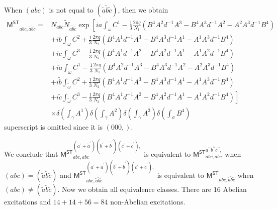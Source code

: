 \documentclass[11pt,nofootinbib,preprint]{revtex4-1}
\begin{document}
When $\left(abc\right)$ is not equal to $\left(\tilde{a}\tilde{b}\tilde{c}\right)$, then we obtain
\begin{align}
	\mathsf{M^{ST}}_{abc,\tilde{a}\tilde{b}\tilde{c}}=&N_{abc}\tilde{N}_{\tilde{a}\tilde{b}\tilde{c}}\exp \left[ ia\int_{\omega}{C^1-\frac{1}{3}\frac{2\pi q}{N_1}\left( B^4A^2d^{-1}A^3-B^4A^3d^{-1}A^2-A^2A^3d^{-1}B^4 \right)} \right. \nonumber
	\\
	&+ib\int_{\omega}{C^2+\frac{1}{3}\frac{2\pi q}{N_2}\left( B^4A^1d^{-1}A^3-B^4A^3d^{-1}A^1-A^1A^3d^{-1}B^4 \right)} \nonumber
	\\
	&+ic\int_{\omega}{C^3-\frac{1}{3}\frac{2\pi q}{N_3}\left( B^4A^1d^{-1}A^2-B^4A^2d^{-1}A^1-A^1A^2d^{-1}B^4 \right)} \nonumber
	\\
	&+i\tilde{a}\int_{\tilde{\omega}}{C^1-\frac{1}{3}\frac{2\pi q}{N_1}\left( B^4A^2d^{-1}A^3-B^4A^3d^{-1}A^2-A^2A^3d^{-1}B^4 \right)} \nonumber
	\\
	&+i\tilde{b}\int_{\tilde{\omega}}{C^2+\frac{1}{3}\frac{2\pi q}{N_2}\left( B^4A^1d^{-1}A^3-B^4A^3d^{-1}A^1-A^1A^3d^{-1}B^4 \right)} \nonumber
	\\
	&+\left. i\tilde{c}\int_{\tilde{\omega}}{C^3-\frac{1}{3}\frac{2\pi q}{N_3}\left( B^4A^1d^{-1}A^2-B^4A^2d^{-1}A^1-A^1A^2d^{-1}B^4 \right)} \right] \nonumber
	\\
	&\times \delta \left( \int_{\gamma}{A^1} \right) \delta \left( \int_{\gamma}{A^2} \right) \delta \left( \int_{\gamma}{A^3} \right) \delta \left( \int_{\sigma}{B^4} \right) 
\end{align}
superscript is omitted since it is $\left(000,\right)$. 

We conclude that $\mathsf{M^{ST}}_{abc,abc}^{\left( a^{\prime}+\tilde{a}^{\prime} \right) \left( b^{\prime}+\tilde{b}^{\prime} \right) \left( c^{\prime}+\tilde{c}^{\prime} \right),}$ is equivalent to $\mathsf{M^{ST}}_{abc,abc}^{a^{\prime\prime}b^{\prime\prime}c^{\prime\prime},}$ when $\left(abc\right)=\left(\tilde{a}\tilde{b}\tilde{c}\right)$ and $\mathsf{M^{ST}}_{abc,\tilde{a}\tilde{b}\tilde{c}}^{\left( a^{\prime}+\tilde{a}^{\prime} \right) \left( b^{\prime}+\tilde{b}^{\prime} \right) \left( c^{\prime}+\tilde{c}^{\prime} \right),}$ is equivalent to $\mathsf{M^{ST}}_{abc,\tilde{a}\tilde{b}\tilde{c}}$ when $\left(abc\right)\ne\left(\tilde{a}\tilde{b}\tilde{c}\right)$. Now we obtain all equivalence classes. There are $16$ Abelian excitations and $14+14+56=84$ non-Abelian excitations.
\end{document}
